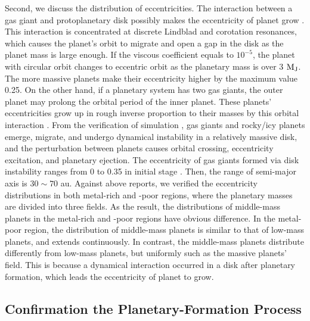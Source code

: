 \documentclass[twocolumn, dvipdfmx]{aastex62}
\begin{document}
\begin{CJK*}{UTF8}{min}
Second, we discuss the distribution of eccentricities. The interaction between a gas giant and protoplanetary disk possibly makes the eccentricity of planet grow \citep{2003ApJ...585.1024G, 2006A&A...447..369K}. This interaction is concentrated at discrete Lindblad and corotation resonances, which causes the planet's orbit to migrate and open a gap in the disk as the planet mass is large enough. If the viscous coefficient equals to $10^{-5}$, the planet with circular orbit changes to eccentric orbit as the planetary mass is over 3 $\rm M_J$. The more massive planets make their eccentricity higher by the maximum value 0.25. On the other hand, if a planetary system has two gas giants, the outer planet may prolong the orbital period of the inner planet. These planets' eccentricities grow up in rough inverse proportion to their masses by this orbital interaction \citep{2002ApJ...564L.105C}. From the verification of simulation \citep{2013ApJ...775...42I}, gas giants and rocky/icy planets emerge, migrate, and undergo dynamical instability in a relatively massive disk, and the perturbation between planets causes orbital crossing, eccentricity excitation, and planetary ejection. The eccentricity of gas giants formed via disk instability ranges from 0 to 0.35 in initial stage \citep{2011ApJ...731...74B}. Then, the range of semi-major axis is $30\sim70$ au. Against above reports, we verified the eccentricity distributions in both metal-rich and -poor regions, where the planetary masses are divided into three fields. As the result, the distributions of middle-mass planets in the metal-rich and -poor regions have obvious difference. In the metal-poor region, the distribution of middle-mass planets is similar to that of low-mass planets, and extends continuously. In contrast, the middle-mass planets distribute differently from low-mass planets, but uniformly such as the massive planets' field. This is because a dynamical interaction occurred in a disk after planetary formation, which leads the eccentricity of planet to grow.


\subsection{Confirmation the Planetary-Formation Process}


\end{CJK*}
\end{document}
